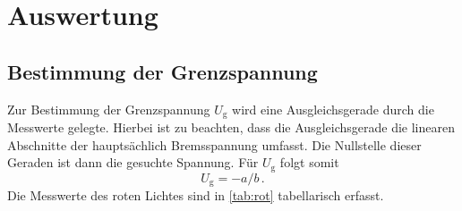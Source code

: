 \section{Auswertung}
\label{sec:Auswertung}



\subsection{Bestimmung der Grenzspannung}
\label{sec:Auswertunga}

Zur Bestimmung der Grenzspannung $U_{\text{g}}$ wird eine Ausgleichsgerade durch die Messwerte gelegte. Hierbei ist zu beachten, dass die Ausgleichsgerade die linearen Abschnitte der hauptsächlich Bremsspannung umfasst.
Die Nullstelle dieser Geraden ist dann die gesuchte Spannung. Für $U_{\text{g}}$ folgt somit
\begin{equation}
    U_{\text{g}}=-a/b\, .
    \label{eqn:U_g}
\end{equation}
Die Messwerte des roten Lichtes sind in \autoref{tab:rot} tabellarisch erfasst.
